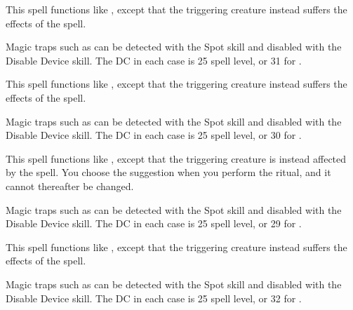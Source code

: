 \begin{spelleffect}
This spell functions like , except that the triggering creature instead suffers the effects of the  spell.
\end{spelleffect}
\begin{spellnotes}
Magic traps such as  can be detected with the Spot skill and disabled with the Disable Device skill. The DC in each case is 25 \add spell level, or 31 for .
\end{spellnotes}

\begin{spelleffect}
This spell functions like , except that the triggering creature instead suffers the effects of the  spell.
\end{spelleffect}
\begin{spellnotes}
Magic traps such as  can be detected with the Spot skill and disabled with the Disable Device skill. The DC in each case is 25 \add spell level, or 30 for .
\end{spellnotes}

\begin{spelleffect}
This spell functions like , except that the triggering creature is instead affected by the  spell. You choose the suggestion when you perform the ritual, and it cannot thereafter be changed.
\end{spelleffect}
\begin{spellnotes}
Magic traps such as  can be detected with the Spot skill and disabled with the Disable Device skill. The DC in each case is 25 \add spell level, or 29 for .
\end{spellnotes}

\begin{spelleffect}
This spell functions like , except that the triggering creature instead suffers the effects of the  spell.
\end{spelleffect}
\begin{spellnotes}
Magic traps such as  can be detected with the Spot skill and disabled with the Disable Device skill. The DC in each case is 25 \add spell level, or 32 for .
\end{spellnotes}


